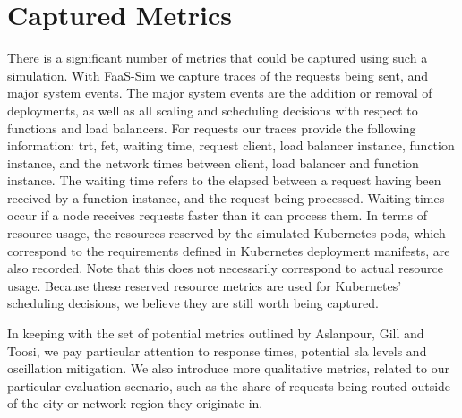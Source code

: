 \section{Captured Metrics}
There is a significant number of metrics that could be captured using such a simulation. With FaaS-Sim we capture traces of the requests being sent, and major system events.
The major system events are the addition or removal of deployments, as well as all scaling and scheduling decisions with respect to functions and load balancers.
For requests our traces provide the following information: \gls{trt}, \gls{fet}, waiting time, request client, load balancer instance, function instance, and the network times between client, load balancer and function instance.
The waiting time refers to the elapsed between a request having been received by a function instance, and the request being processed.
Waiting times occur if a node receives requests faster than it can process them.
In terms of resource usage, the resources reserved by the simulated Kubernetes pods, which correspond to the requirements defined in Kubernetes deployment manifests, are also recorded.
Note that this does not necessarily correspond to actual resource usage.
Because these reserved resource metrics are used for Kubernetes' scheduling decisions, we believe they are still worth being captured.

In keeping with the set of potential metrics outlined by Aslanpour, Gill and Toosi\cite{aslanpourPerformanceEvaluationMetrics2020a}, we pay particular attention to response times, potential \gls{sla} levels and oscillation mitigation.
We also introduce more qualitative metrics, related to our particular evaluation scenario, such as the share of requests being routed outside of the city or network region they originate in.